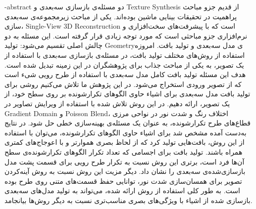\fa-abstract{
دو مسئله‌ی بازسازی سه‌بعدی و \gls{Texture Synthesis} از قدیم جزو مباحث پراهمیت در تحقیقات بینایی ماشین بوده‌اند. یکی از مباحث زیرمجموعه‌ی سه‌بعدی سازی، \gls{Single-View 3D Reconstruction} است که با پیشرفت‌های سخت‌افزاری و نرم‌افزاری جزو مباحثی است که مورد توجه زیادی قرار گرفته است. این مسئله به دو چالش اصلی تقسیم می‌شود: تولید \gls{Geometry}‌ی مدل سه‌بعدی و تولید بافت. امروزه استفاده از روش‌های مختلف تولید بافت، در مسئله‌ی بازسازی سه‌بعدی با استفاده از یک تصویر، به یکی از مباحث جذاب برای پژوهشگران در این زمینه تبدیل شده است. هدف این مسئله تولید بافت کامل مدل سه‌بعدی با استفاده از طرح رویی شیء است که از تصویر ورودی استخراج می‌شود. در این پژوهش ما تلاش می‌کنیم روشی برای تولید بافت مدل سه‌بعدی برای اشیاء حاوی الگو‌های تکرار‌شونده بر روی سطح خود، از یک تصویر، ارائه ‌دهیم. در این روش تلاش شده با استفاده از ویرایش تصاویر در \gls{Gradient Domain} و \gls{Poisson Blend}، اختلاف رنگ و شدت نور در نواحی مرزی قطاع‌های طرح تکرارشونده، به عنوان یک مسئله‌ی بهینه‌سازی خطی حل شود. در نتایج به‌دست آمده مشخص شد برای اشیاء حاوی الگو‌های تکرارشونده، می‌توان با استفاده از این روش، بافت‌هایی تولید کرد که از لحاظ بصری هموار‌تر و با اعوجاج‌های کمتری همراه باشند. تولید بافت برای اجسامی که تعداد تکرار الگو‌های تکرار‌شونده‌ی سطح آن‌ها فرد است، برتری این روش نسبت به تکرار طرح رویی برای قسمت پشت مدل بازسازی‌شده‌ی سه‌بعدی را نشان داد. دیگر مزیت این روش نسبت به روش آینه‌کردن تصویر برای همسان‌سازی شدت نور، توانایی حفظ قسمت‌های متنی روی طرح بوده است. به طور کلی استفاده از روش ارائه شده، می‌تواند به تولید مدل‌های سه‌بعدی بازسازی شده از اشیاء با ویژگی‌های بصری مناسب‌تری نسبت به دیگر روش‌ها بیانجامد. 
}

